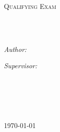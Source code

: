 \documentclass[
11pt, %
oneside, %
english, %
doublespacing, %
headsepline, %
]{MastersDoctoralThesis} %
\author{Luke \textsc{Anderson-Trocm\'e}} %
\begin{document}
\frontmatter %

\pagestyle{plain} %


\begin{titlepage}
\begin{center}

\vspace*{.06\textheight}
{\scshape\LARGE \univname\par}\vspace{1.5cm} %
\textsc{\Large Qualifying Exam}\\[0.5cm] %

\HRule \\[0.4cm] %
{\huge \bfseries \ttitle\par}\vspace{0.4cm} %
\HRule \\[1.5cm] %
 
\begin{minipage}[t]{0.4\textwidth}
\begin{flushleft} \large
\emph{Author:}\\
{\authorname} %
\end{flushleft}
\end{minipage}
\begin{minipage}[t]{0.4\textwidth}
\begin{flushright} \large
\emph{Supervisor:} \\
{\supname} %
\end{flushright}
\end{minipage}\\[3cm]
 
\vfill

\groupname\\\deptname\\[2cm] %
 
\vfill

{\large \today}\\[4cm] %
 
\vfill
\end{center}
\end{titlepage}
\end{document}
